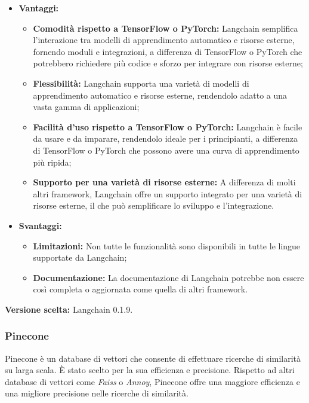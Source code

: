 \documentclass[10pt, a4paper]{article}
\begin{document}
\begin{itemize}
\item \textbf{Vantaggi:}
\begin{itemize}
\item \textbf{Comodità rispetto a TensorFlow o PyTorch:} Langchain semplifica l'interazione tra modelli di apprendimento automatico e risorse esterne, fornendo moduli e integrazioni, a differenza di TensorFlow o PyTorch che potrebbero richiedere più codice e sforzo per integrare con risorse esterne;
\item \textbf{Flessibilità:} Langchain supporta una varietà di modelli di apprendimento automatico e risorse esterne, rendendolo adatto a una vasta gamma di applicazioni;
\item \textbf{Facilità d'uso rispetto a TensorFlow o PyTorch:} Langchain è facile da usare e da imparare, rendendolo ideale per i principianti, a differenza di TensorFlow o PyTorch che possono avere una curva di apprendimento più ripida;
\item \textbf{Supporto per una varietà di risorse esterne:} A differenza di molti altri framework, Langchain offre un supporto integrato per una varietà di risorse esterne, il che può semplificare lo sviluppo e l'integrazione.
\end{itemize}
\item \textbf{Svantaggi:}
\begin{itemize}
\item \textbf{Limitazioni:} Non tutte le funzionalità sono disponibili in tutte le lingue supportate da Langchain;
\item \textbf{Documentazione:} La documentazione di Langchain potrebbe non essere così completa o aggiornata come quella di altri framework.
\end{itemize}
\end{itemize}
\textbf{Versione scelta:} Langchain 0.1.9.

\subsubsection{Pinecone}
Pinecone è un database di vettori che consente di effettuare ricerche di similarità su larga scala. È stato scelto per la sua efficienza e precisione. Rispetto ad altri database di vettori come \textit{Faiss\pg} o \textit{Annoy\pg}, Pinecone offre una maggiore efficienza e una migliore precisione nelle ricerche di similarità.
\end{document}
